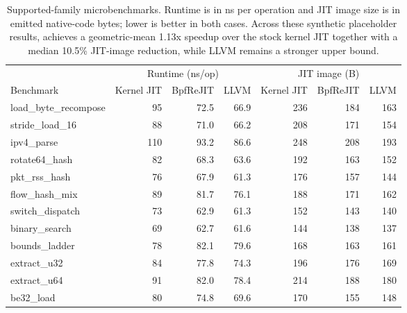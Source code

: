 \begin{table}[t]
  \centering
  \caption{Supported-family microbenchmarks. Runtime is in ns per operation and JIT image size is in emitted native-code bytes; lower is better in both cases. Across these synthetic placeholder results, \tool achieves a geometric-mean 1.13x speedup over the stock kernel JIT together with a median 10.5\% JIT-image reduction, while LLVM remains a stronger upper bound. }
  \label{tab:rq1-micro-overview}
  \scriptsize
  \begin{tabular}{lrrrrrr}
    \toprule
    & \multicolumn{3}{c}{Runtime (ns/op)} & \multicolumn{3}{c}{JIT image (B)} \\
    \cmidrule(lr){2-4} \cmidrule(l){5-7}
    Benchmark & Kernel JIT & BpfReJIT & LLVM & Kernel JIT & BpfReJIT & LLVM \\
    \midrule
    load\_byte\_recompose & 95 & 72.5 & 66.9 & 236 & 184 & 163 \\
    stride\_load\_16 & 88 & 71.0 & 66.2 & 208 & 171 & 154 \\
    ipv4\_parse & 110 & 93.2 & 86.6 & 248 & 208 & 193 \\
    rotate64\_hash & 82 & 68.3 & 63.6 & 192 & 163 & 152 \\
    pkt\_rss\_hash & 76 & 67.9 & 61.3 & 176 & 157 & 144 \\
    flow\_hash\_mix & 89 & 81.7 & 76.1 & 188 & 171 & 162 \\
    switch\_dispatch & 73 & 62.9 & 61.3 & 152 & 143 & 140 \\
    binary\_search & 69 & 62.7 & 61.6 & 144 & 138 & 137 \\
    bounds\_ladder & 78 & 82.1 & 79.6 & 168 & 163 & 161 \\
    extract\_u32 & 84 & 77.8 & 74.3 & 196 & 176 & 169 \\
    extract\_u64 & 91 & 82.0 & 78.4 & 214 & 188 & 180 \\
    be32\_load & 80 & 74.8 & 69.6 & 170 & 155 & 148 \\
    \bottomrule
  \end{tabular}
\end{table}
